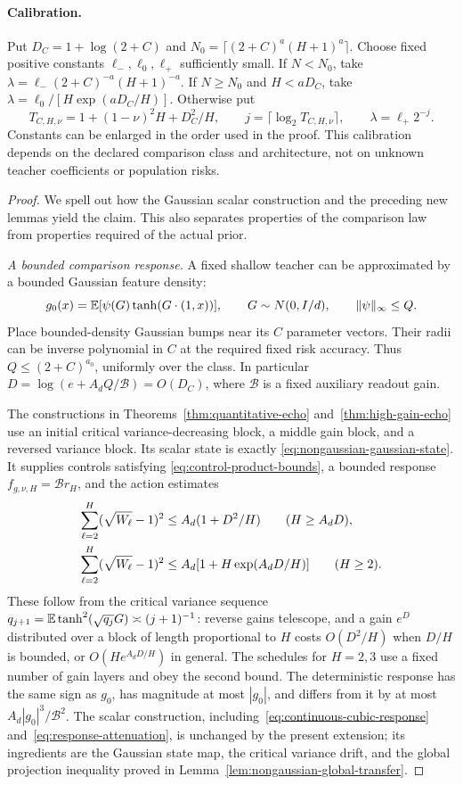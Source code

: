 \paragraph{Calibration.}
Put $D_C=1+\log(2+C)$ and
$N_0=\lceil(2+C)^a(H+1)^a\rceil$.
Choose fixed positive constants $\ell_-,\ell_0,\ell_+$ sufficiently
small. If $N<N_0$, take
$\lambda=\ell_-(2+C)^{-a}(H+1)^{-a}$.
If $N\ge N_0$ and $H<aD_C$, take
$\lambda=\ell_0/[H\exp(aD_C/H)]$.
Otherwise put
\[
 T_{C,H,\nu}=1+(1-\nu)^2H+D_C^2/H,
 \qquad j=\lceil\log_2 T_{C,H,\nu}\rceil,
 \qquad\lambda=\ell_+2^{-j}.
\]
Constants can be enlarged in the order used in the proof. This
calibration depends on the declared comparison class and architecture,
not on unknown teacher coefficients or population risks.

\begin{proof}
We spell out how the Gaussian scalar construction and the preceding
new lemmas yield the claim. This also separates properties of the
comparison law from properties required of the actual prior.

\emph{A bounded comparison response.}
A fixed shallow teacher can be approximated by a bounded Gaussian
feature density:
\[
 g_0(x)=\mathbb E[\psi(G)\tanh(G\cdot(1,x))],
 \qquad G\sim N(0,I/d),\qquad \|\psi\|_\infty\le Q.
\]
Place bounded-density Gaussian bumps near its $C$ parameter vectors.
Their radii can be inverse polynomial in $C$ at the required fixed
risk accuracy. Thus $Q\le(2+C)^{a_0}$, uniformly over the class.
In particular $D=\log(e+A_dQ/\mathcal B)=O(D_C)$, where
$\mathcal B$ is a fixed auxiliary readout gain.

The constructions in Theorems~\ref{thm:quantitative-echo} and~\ref{thm:high-gain-echo} use an initial critical
variance-decreasing block, a middle gain block, and a reversed
variance block. Its scalar state is exactly
\eqref{eq:nongaussian-gaussian-state}. It supplies controls satisfying
\eqref{eq:control-product-bounds}, a bounded response
$f_{g,\nu,H}=\mathcal B r_H$, and the action estimates
\begin{align}
 \sum_{\ell=2}^H(\sqrt{W_\ell}-1)^2
 &\le A_d(1+D^2/H)\qquad(H\ge A_dD),\notag\\
 \sum_{\ell=2}^H(\sqrt{W_\ell}-1)^2
 &\le A_d[1+H\exp(A_dD/H)]\qquad(H\ge2).
 \label{eq:nongaussian-schedule-action}
\end{align}
These follow from the critical variance sequence
$q_{j+1}=\mathbb E\tanh^2(\sqrt{q_j}G)\asymp(j+1)^{-1}$:
reverse gains telescope, and a gain $e^D$ distributed over a block
of length proportional to $H$ costs $O(D^2/H)$ when $D/H$ is bounded,
or $O(H e^{A_dD/H})$ in general. The schedules for $H=2,3$ use a
fixed number of gain layers and obey the second bound.
The deterministic response has the same sign as $g_0$, has magnitude
at most $|g_0|$, and differs from it by at most
$A_d|g_0|^3/\mathcal B^2$. The scalar construction, including~\eqref{eq:continuous-cubic-response} and~\eqref{eq:response-attenuation}, is unchanged
by the present extension; its ingredients are the Gaussian state map,
the critical variance drift, and the global projection inequality
proved in Lemma~\ref{lem:nongaussian-global-transfer}.


\end{proof}
